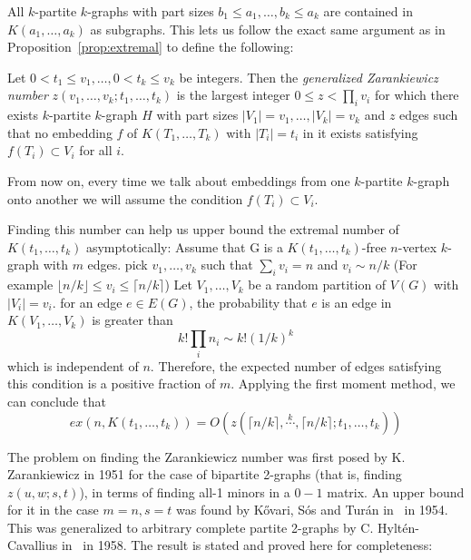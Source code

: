 \begin{remark}
    All $k$-partite $k$-graphs with part sizes $b_1 \leq a_1, \dots, b_k \leq a_k$
    are contained in $K(a_1, \dots, a_k)$ as subgraphs.
    This lets us follow the exact same argument as in Proposition~\ref{prop:extremal}
    to define the following:
\end{remark}

\begin{definition}\label{def:zarankiewicz}
    Let $0 < t_1 \leq v_1, \dots, 0 < t_k \leq v_k$ be integers.
    Then the \emph{generalized Zarankiewicz number} $z(v_1, \dots, v_k; t_1, \dots, t_k)$
    is the largest integer $0 \leq z < \prod_i{ v_i}$ for which there exists $k$-partite $k$-graph
    $H$ with part sizes $ |V_1| = v_1, \dots, |V_k| = v_k$ and $z$ edges
    such that no embedding $f$ of $K(T_1, \dots, T_k)$ with $|T_i| = t_i$ in it exists
    satisfying $f(T_i) \subset V_i$ for all $i$.
\end{definition}

From now on, every time we talk about embeddings from one $k$-partite $k$-graph
onto another we will assume the condition $f(T_i) \subset V_i$.

\begin{remark}\label{rem:zar_vs_turan}
    Finding this number can help us upper bound the extremal number of $K(t_1, \dots, t_k)$ asymptotically:
    Assume that G is a $K(t_1, \dots, t_k)$-free $n$-vertex $k$-graph with $m$ edges.
    pick $v_1, \dots, v_k$ such that $\sum_{i} v_i = n $ and $v_i \sim n/k $
    (For example $\lfloor n/k \rfloor \leq v_i \leq \lceil n/k \rceil$)
    Let $V_1, \dots, V_k$ be a random partition of $V(G)$ with $|V_i| = v_i$.
    for an edge $e \in E(G)$, the probability that $e$ is an edge in $K(V_1, \dots, V_k)$ is
    greater than
    \[k! \prod_i n_i \sim k! (1/k)^k\]
    which is independent of $n$.
    Therefore, the expected number of edges satisfying this condition is a positive fraction of $m$.
    Applying the first moment method, we can conclude that
    \[ex(n, K(t_1, \dots, t_k)) = O(z(\lceil n / k \rceil , \overset{k}{\cdots}, \lceil n / k \rceil; t_1, \dots, t_k))\]

\end{remark}


The problem on finding the Zarankiewicz number was first posed by K. Zarankiewicz in 1951 for the
case of bipartite 2-graphs (that is, finding $z(u, w; s, t)$),
in terms of finding all-1 minors in a $0-1$ matrix.
An upper bound for it in the case $m=n, s=t$ was found by Kővari, Sós and Turán in~\cite{Kovari1954} in 1954.
This was generalized to arbitrary complete
partite 2-graphs by C. Hyltén-Cavallius in~\cite{Hylten1958}
in 1958.
The result is stated and proved here for completeness:

